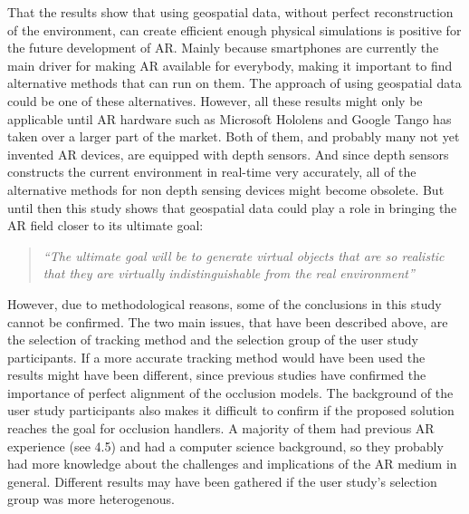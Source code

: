 That the results show that using geospatial data, without perfect reconstruction of the environment, can create efficient enough physical simulations is positive for the future development of AR. Mainly because smartphones are currently the main driver for making AR available for everybody, making it important to find alternative methods that can run on them. The approach of using geospatial data could be one of these alternatives. However, all these results might only be applicable until AR hardware such as Microsoft Hololens and Google Tango has taken over a larger part of the market. Both of them, and probably many not yet invented AR devices, are equipped with depth sensors. And since depth sensors constructs the current environment in real-time very accurately, all of the alternative methods for non depth sensing devices might become obsolete. But until then this study shows that geospatial data could play a role in bringing the AR field closer to its ultimate goal: 

\begin{quote}
\textit{``The ultimate goal will be to generate virtual objects that are so realistic that they are virtually indistinguishable from the real environment''} \cite{azuma1997survey}
\end{quote} 

However, due to methodological reasons, some of the conclusions in this study cannot be confirmed. The two main issues, that have been described above, are the selection of tracking method and the selection group of the user study participants. If a more accurate tracking method would have been used the results might have been different, since previous studies have confirmed the importance of perfect alignment of the occlusion models. The background of the user study participants also makes it difficult to confirm if the proposed solution reaches the goal for occlusion handlers. A majority of them had previous AR experience (see 4.5) and had a computer science background, so they probably had more knowledge about the challenges and implications of the AR medium in general. Different results may have been gathered if the user study's selection group was more heterogenous.

